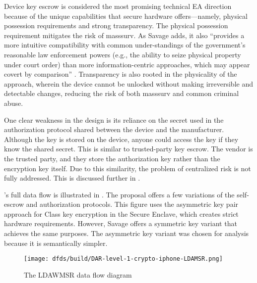 Device key escrow is considered the most promising technical \ac{EA} direction because of the unique capabilities that
secure hardware offers---namely, physical possession requirements and strong transparency. The physical possession
requirement mitigates the risk of \ac{masssurv}. As Savage adds, it also ``provides a more intuitive compatibility with
common under-standings of the government’s reasonable law enforcement powers (e.g., the ability to seize physical
property under court order) than more information-centric approaches, which may appear covert by comparison''
\cite{savage_lawful_2018}. Transparency is also rooted in the physicality of the approach, wherein the device cannot be
unlocked without making irreversible and detectable changes, reducing the risk of both \ac{masssurv} and common criminal
abuse.

One clear weakness in the design is its reliance on the secret used in the authorization protocol shared between the
device and the manufacturer. Although the key is stored on the device, anyone could access the key if they know the
shared secret. This is similar to trusted-party key escrow. The vendor is the trusted party, and they store the
authorization key rather than the encryption key itself. Due to this similarity, the problem of centralized risk is not
fully addressed. This is discussed further in .

\ldawmsR's full data flow is illustrated in . The proposal offers a few variations of the
self-escrow and authorization protocols. This figure uses the asymmetric key pair approach for Class key encryption in
the Secure Enclave, which creates strict hardware requirements. However, Savage offers a symmetric key variant that
achieves the same purposes. The asymmetric key variant was chosen for analysis because it is semantically simpler.

\begin{figure}[p]
    \centering\CaptionFontSize
    \texttt{[image: dfds/build/DAR-level-1-crypto-iphone-LDAMSR.png]}
    \caption{The LDAWMSR data flow diagram}
    \label{fig-dfd-ldawmsr}
\end{figure}

